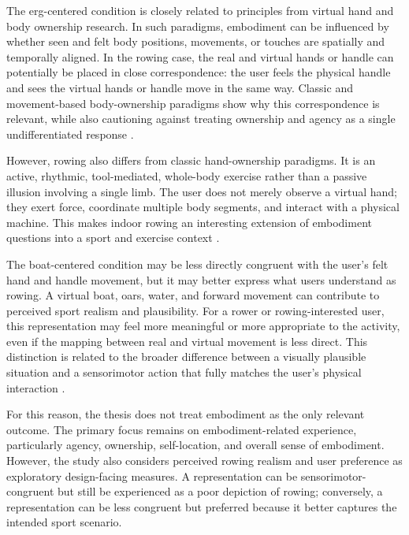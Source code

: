 The erg-centered condition is closely related to principles from virtual hand and body ownership research. In such paradigms, embodiment can be influenced by whether seen and felt body positions, movements, or touches are spatially and temporally aligned. In the rowing case, the real and virtual hands or handle can potentially be placed in close correspondence: the user feels the physical handle and sees the virtual hands or handle move in the same way. Classic and movement-based body-ownership paradigms show why this correspondence is relevant, while also cautioning against treating ownership and agency as a single undifferentiated response \parencite{botvinickCohen1998rubberHand,kalckertEhrsson2012movingRubberHand,kilteniEtAl2012senseEmbodiment}.

However, rowing also differs from classic hand-ownership paradigms. It is an active, rhythmic, tool-mediated, whole-body exercise rather than a passive illusion involving a single limb. The user does not merely observe a virtual hand; they exert force, coordinate multiple body segments, and interact with a physical machine. This makes indoor rowing an interesting extension of embodiment questions into a sport and exercise context \parencite{rauterEtAl2013rowingTransfer}.

The boat-centered condition may be less directly congruent with the user's felt hand and handle movement, but it may better express what users understand as rowing. A virtual boat, oars, water, and forward movement can contribute to perceived sport realism and plausibility. For a rower or rowing-interested user, this representation may feel more meaningful or more appropriate to the activity, even if the mapping between real and virtual movement is less direct. This distinction is related to the broader difference between a visually plausible situation and a sensorimotor action that fully matches the user's physical interaction \parencite{slater2009placePlausibility,harrisEtAl2019visionForAction}.

For this reason, the thesis does not treat embodiment as the only relevant outcome. The primary focus remains on embodiment-related experience, particularly agency, ownership, self-location, and overall sense of embodiment. However, the study also considers perceived rowing realism and user preference as exploratory design-facing measures. A representation can be sensorimotor-congruent but still be experienced as a poor depiction of rowing; conversely, a representation can be less congruent but preferred because it better captures the intended sport scenario.

